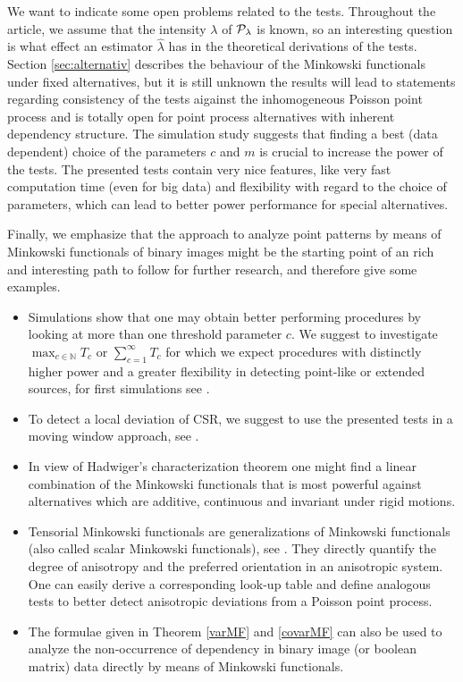 \documentclass[12pt]{article}
\def\N{\mathbb{N}}
\begin{document}
We want to indicate some open problems related to the tests. Throughout the article, we assume that the intensity $\lambda$ of ${\cal P}_\lambda$ is known, so an interesting question is what effect an estimator $\widehat{\lambda}$ has in the theoretical derivations of the tests. Section \ref{sec:alternativ} describes the behaviour of the Minkowski functionals under fixed alternatives, but it is still unknown the results will lead to statements regarding consistency of the tests aigainst the inhomogeneous Poisson point process and is totally open for point process alternatives with inherent dependency structure. The simulation study suggests that finding a best (data dependent) choice of the parameters $c$ and $m$ is crucial to increase the power of the tests. The presented tests contain very nice features, like very fast computation time (even for big data) and flexibility with regard to the choice of parameters, which can lead to better power performance for special alternatives.

Finally, we emphasize that the approach to analyze point patterns by means of Minkowski functionals of binary images might be the starting point of an rich and interesting path to follow for further research, and therefore give some examples.
\begin{itemize}
\item Simulations show that one may obtain better performing procedures by looking at more than one threshold parameter $c$. We suggest to investigate $\max_{c\in\N} T_c$ or $\sum_{c=1}^\infty T_c$ for which we expect procedures with distinctly higher power and a greater flexibility in detecting point-like or extended sources, for first simulations see \cite{44}.

\item To detect a local deviation of CSR, we suggest to use the presented tests in a moving window approach, see \cite{42}.

\item In view of Hadwiger's characterization theorem one might find a linear combination of the Minkowski functionals that is most powerful against alternatives which are additive, continuous and invariant under rigid motions.

\item Tensorial Minkowski functionals are generalizations of Minkowski functionals (also called scalar Minkowski functionals), see \cite{19,43}. They directly quantify the degree of anisotropy and the preferred orientation in an anisotropic system. One can easily derive a corresponding look-up table \cite{44} and define analogous tests to better detect anisotropic deviations from a Poisson point process.

\item The formulae given in Theorem \ref{varMF} and \ref{covarMF} can also be used to analyze the non-occurrence of dependency in binary image (or boolean matrix) data directly by means of Minkowski functionals.
\end{itemize}
\end{document}
